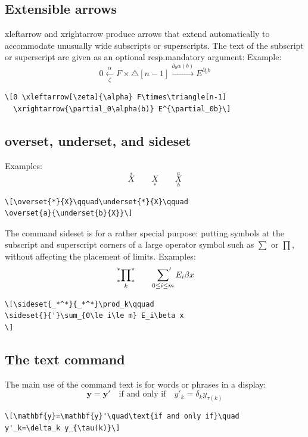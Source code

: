\documentclass[manuscript, printscheme]{aomart}
\newcommand{\ntt}{\normalfont\ttfamily}
\newcommand{\cn}[1]{{\protect\ntt\bslash#1}}
\newtheorem[{}\it]{thm}{Theorem}[section]
\theoremstyle{definition}
\newtheorem*[{}\it]{notation}{Notation}
\begin{document}
\subsection{Extensible arrows}
\cn{xleftarrow} and \cn{xrightarrow} produce
arrows that extend automatically to accommodate unusually wide
subscripts or superscripts.  The text of the subscript or superscript
are given as an optional resp.\@ mandatory argument:
Example:
\[0 \xleftarrow[\zeta]{\alpha} F\times\triangle[n-1]
  \xrightarrow{\partial_0\alpha(b)} E^{\partial_0b}\]
\begin{verbatim}
\[0 \xleftarrow[\zeta]{\alpha} F\times\triangle[n-1]
  \xrightarrow{\partial_0\alpha(b)} E^{\partial_0b}\]
\end{verbatim}

\subsection{\cn{overset}, \cn{underset}, and \cn{sideset}}
Examples:
\[\overset{*}{X}\qquad\underset{*}{X}\qquad
\overset{a}{\underset{b}{X}}\]
\begin{verbatim}
\[\overset{*}{X}\qquad\underset{*}{X}\qquad
\overset{a}{\underset{b}{X}}\]
\end{verbatim}

The command \cn{sideset} is for a rather special
purpose: putting symbols at the subscript and superscript
corners of a large operator symbol such as $\sum$ or $\prod$,
without affecting the placement of limits.
Examples:
\[\sideset{_*^*}{_*^*}\prod_k\qquad
\sideset{}{'}\sum_{0\le i\le m} E_i\beta x
\]
\begin{verbatim}
\[\sideset{_*^*}{_*^*}\prod_k\qquad
\sideset{}{'}\sum_{0\le i\le m} E_i\beta x
\]
\end{verbatim}

\subsection{The \cn{text} command}
The main use of the command \cn{text} is for words or phrases in a
display:
\[\mathbf{y}=\mathbf{y}'\quad\text{if and only if}\quad
y'_k=\delta_k y_{\tau(k)}\]
\begin{verbatim}
\[\mathbf{y}=\mathbf{y}'\quad\text{if and only if}\quad
y'_k=\delta_k y_{\tau(k)}\]
\end{verbatim}
\end{document}
